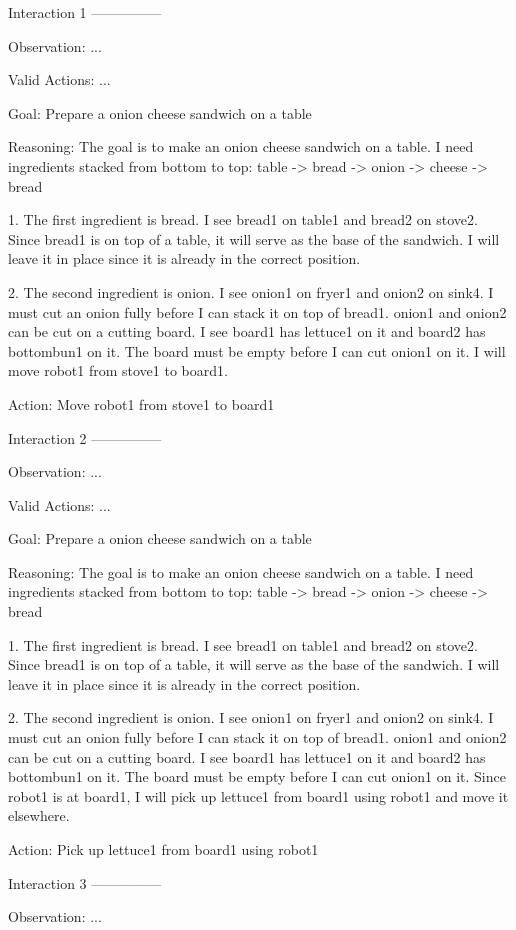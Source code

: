 Interaction 1
---------------


Observation:
...

Valid Actions:
...

Goal: Prepare a onion cheese sandwich on a table


Reasoning: The goal is to make an onion cheese sandwich on a table. I need ingredients stacked from bottom to top: table -> bread -> onion -> cheese -> bread

1. The first ingredient is bread. I see bread1 on table1 and bread2 on stove2. Since bread1 is on top of a table, it will serve as the base of the sandwich. I will leave it in place since it is already in the correct position.

2. The second ingredient is onion. I see onion1 on fryer1 and onion2 on sink4. I must cut an onion fully before I can stack it on top of bread1. onion1 and onion2 can be cut on a cutting board. I see board1 has lettuce1 on it and board2 has bottombun1 on it. The board must be empty before I can cut onion1 on it. I will move robot1 from stove1 to board1.

Action: Move robot1 from stove1 to board1


Interaction 2
---------------


Observation:
...

Valid Actions:
...

Goal: Prepare a onion cheese sandwich on a table


Reasoning: The goal is to make an onion cheese sandwich on a table. I need ingredients stacked from bottom to top: table -> bread -> onion -> cheese -> bread

1. The first ingredient is bread. I see bread1 on table1 and bread2 on stove2. Since bread1 is on top of a table, it will serve as the base of the sandwich. I will leave it in place since it is already in the correct position.

2. The second ingredient is onion. I see onion1 on fryer1 and onion2 on sink4. I must cut an onion fully before I can stack it on top of bread1. onion1 and onion2 can be cut on a cutting board. I see board1 has lettuce1 on it and board2 has bottombun1 on it. The board must be empty before I can cut onion1 on it. Since robot1 is at board1, I will pick up lettuce1 from board1 using robot1 and move it elsewhere.

Action: Pick up lettuce1 from board1 using robot1


Interaction 3
---------------


Observation:
...


